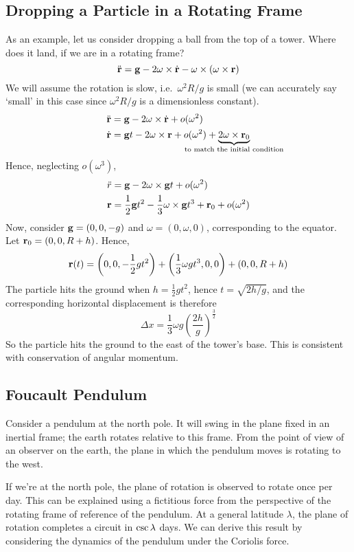 \subsection{Dropping a Particle in a Rotating Frame}
As an example, let us consider dropping a ball from the top of a tower. Where does it land, if we are in a rotating frame?
\[ \ddot{\vb{r}} = \vb g - 2\vb\omega \times \dot{\vb{r}} - \vb\omega \times (\vb\omega \times \vb r) \]
We will assume the rotation is slow, i.e.\ \(\omega^2 R / g\) is small (we can accurately say `small' in this case since \(\omega^2R/g\) is a dimensionless constant).
\begin{align*}
	\rddot & = \vb g - 2\omega \times \rdot + o(\omega^2)                                                                                          \\
	\rdot  & = \vb gt - 2\omega \times \vb r + o(\omega^2) + \underbrace{2\omega\times \vb r_0}_{\mathclap{\text{to match the initial condition}}}
\end{align*}
Hence, neglecting \(o(\omega^3)\),
\begin{align*}
	\ddot r & = \vb g - 2\omega \times \vb gt + o(\omega^2)                                       \\
	\vb r   & = \frac{1}{2}\vb gt^2 - \frac{1}{3}\vb\omega\times \vb gt^3 + \vb r_0 + o(\omega^2)
\end{align*}
Now, consider \(\vb g = (0, 0, -g)\) and \(\omega = (0, \omega, 0)\), corresponding to the equator. Let \(\vb r_0 = (0, 0, R + h)\). Hence,
\[ \vb r(t) = \qty(0, 0, -\frac{1}{2}gt^2) + \qty(\frac{1}{3}\omega g t^3, 0, 0) + (0, 0, R + h) \]
The particle hits the ground when \(h = \frac{1}{2}gt^2\), hence \(t = \sqrt{2h/g}\), and the corresponding horizontal displacement is therefore
\[ \Delta x = \frac{1}{3}\omega g \left( \frac{2h}{g} \right)^{\frac{3}{2}} \]
So the particle hits the ground to the east of the tower's base. This is consistent with conservation of angular momentum.

\subsection{Foucault Pendulum}
Consider a pendulum at the north pole. It will swing in the plane fixed in an inertial frame; the earth rotates relative to this frame. From the point of view of an observer on the earth, the plane in which the pendulum moves is rotating to the west.

If we're at the north pole, the plane of rotation is observed to rotate once per day. This can be explained using a fictitious force from the perspective of the rotating frame of reference of the pendulum. At a general latitude \(\lambda\), the plane of rotation completes a circuit in \(\cosecant\lambda\) days. We can derive this result by considering the dynamics of the pendulum under the Coriolis force.
